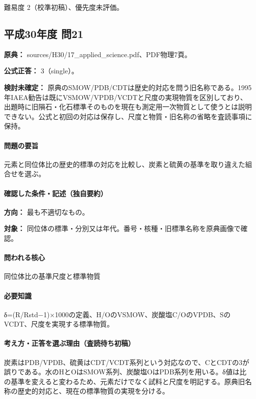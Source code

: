 \par 難易度 2（校準初稿）、優先度未評価。

\subsection{平成30年度 問21}
\label{q:h30-reg-applied-21}

\noindent\textbf{原典：} sources/H30/17\_applied\_science.pdf、PDF物理7頁。

\textbf{公式正答：} 3（single）。

\par\textbf{検討未確定：} 原典のSMOW/PDB/CDTは歴史的対応を問う旧名称である。1995年IAEA勧告は既にVSMOW/VPDB/VCDTと尺度の実現物質を区別しており、出題時に旧隕石・化石標準そのものを現在も測定用一次物質として使うとは説明できない。公式と初回の対応は保存し、尺度と物質・旧名称の省略を査読事項に保持。

\paragraph{問題の要旨} 元素と同位体比の歴史的標準の対応を比較し、炭素と硫黄の基準を取り違えた組合せを選ぶ。

\paragraph{確認した条件・記述（独自要約）}\mbox{}\par

\noindent\textbf{方向：} 最も不適切なもの。\par

\noindent\textbf{対象：} 同位体の標準・分別又は年代。番号・核種・旧標準名称を原典画像で確認。\par

\paragraph{問われる核心} 同位体比の基準尺度と標準物質

\paragraph{必要知識} δ=(R/Rstd−1)×1000の定義、H/OのVSMOW、炭酸塩C/OのVPDB、SのVCDT、尺度を実現する標準物質。

\paragraph{考え方・正答を選ぶ理由（査読待ち初稿）} 炭素はPDB/VPDB、硫黄はCDT/VCDT系列という対応なので、CとCDTの3が誤りである。水のHとOはSMOW系列、炭酸塩OはPDB系列を用いる。δ値は比の基準を変えると変わるため、元素だけでなく試料と尺度を明記する。原典旧名称の歴史的対応と、現在の標準物質の実現を分ける。

